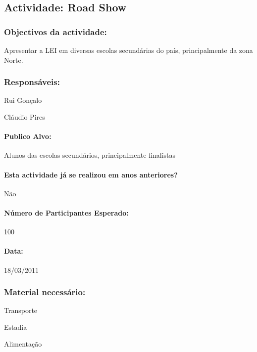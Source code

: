 \subsection{Actividade: Road Show} %

\subsubsection*{Objectivos da actividade:}
Apresentar a LEI em diversas escolas secundárias do país, principalmente da zona Norte.

\subsubsection*{Responsáveis:}
\begin{itemizedash}
	\item{Rui Gonçalo}
	\item{Cláudio Pires}
\end{itemizedash}

\paragraph{Publico Alvo: }
Alunos das escolas secundários, principalmente finalistas

\paragraph{Esta actividade já se realizou em anos anteriores?}
Não

\paragraph{Número de Participantes Esperado:}
100

\paragraph{Data:} 18/03/2011

\subsubsection*{Material necessário:}
\begin{itemizedash}
	\item{Transporte}
	\item{Estadia}
	\item{Alimentação}
\end{itemizedash}


